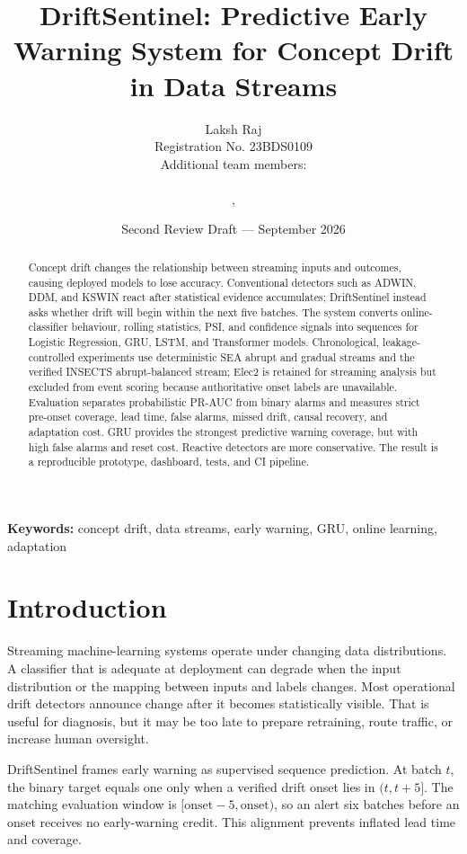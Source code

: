 \documentclass[10pt,twocolumn]{article}
\title{\textbf{DriftSentinel: Predictive Early Warning System for Concept Drift in Data Streams}}
\author{Laksh Raj\\Registration No. 23BDS0109\\Additional team members: \rule{3.2cm}{0.4pt}, \rule{3.2cm}{0.4pt}}
\date{Second Review Draft --- September 2026}
\begin{document}
\maketitle

\begin{abstract}
Concept drift changes the relationship between streaming inputs and outcomes, causing deployed models to lose accuracy. Conventional detectors such as ADWIN, DDM, and KSWIN react after statistical evidence accumulates; DriftSentinel instead asks whether drift will begin within the next five batches. The system converts online-classifier behaviour, rolling statistics, PSI, and confidence signals into sequences for Logistic Regression, GRU, LSTM, and Transformer models. Chronological, leakage-controlled experiments use deterministic SEA abrupt and gradual streams and the verified INSECTS abrupt-balanced stream; Elec2 is retained for streaming analysis but excluded from event scoring because authoritative onset labels are unavailable. Evaluation separates probabilistic PR-AUC from binary alarms and measures strict pre-onset coverage, lead time, false alarms, missed drift, causal recovery, and adaptation cost. GRU provides the strongest predictive warning coverage, but with high false alarms and reset cost. Reactive detectors are more conservative. The result is a reproducible prototype, dashboard, tests, and CI pipeline.
\end{abstract}

\noindent\textbf{Keywords:} concept drift, data streams, early warning, GRU, online learning, adaptation

\section{Introduction}
Streaming machine-learning systems operate under changing data distributions. A classifier that is adequate at deployment can degrade when the input distribution or the mapping between inputs and labels changes. Most operational drift detectors announce change after it becomes statistically visible. That is useful for diagnosis, but it may be too late to prepare retraining, route traffic, or increase human oversight.

DriftSentinel frames early warning as supervised sequence prediction. At batch $t$, the binary target equals one only when a verified drift onset lies in $(t,t+5]$. The matching evaluation window is $[\mathrm{onset}-5,\mathrm{onset})$, so an alert six batches before an onset receives no early-warning credit. This alignment prevents inflated lead time and coverage.
\end{document}

